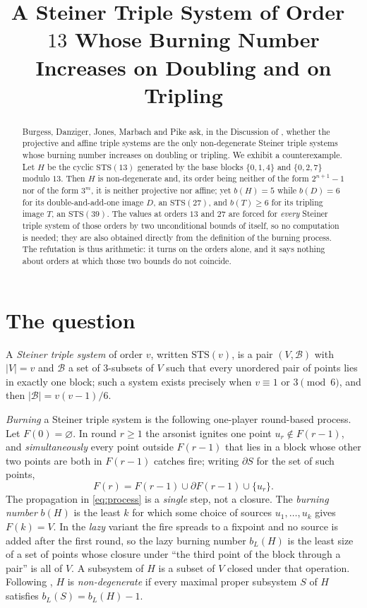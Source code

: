 \documentclass[11pt]{amsart}
\title[An $\STS(13)$ whose burning number increases]
{A Steiner Triple System of Order~$13$ Whose Burning Number
 Increases on Doubling and on Tripling}
\date{}
\newcommand{\STS}{\mathrm{STS}}
\newcommand{\bL}{b_{L}}
\begin{document}
\begin{abstract}
Burgess, Danziger, Jones, Marbach and Pike ask, in the Discussion of
\cite{BDJMP}, whether the projective and affine triple systems are the only
non-degenerate Steiner triple systems whose burning number increases on
doubling or tripling. We exhibit a counterexample. Let $H$ be the cyclic
$\STS(13)$ generated by the base blocks $\{0,1,4\}$ and $\{0,2,7\}$ modulo
$13$. Then $H$ is non-degenerate and, its order being neither of the form
$2^{n+1}-1$ nor of the form $3^{m}$, it is neither projective nor affine; yet
$b(H)=5$ while $b(D)=6$ for its double-and-add-one image $D$, an $\STS(27)$,
and $b(T)\ge6$ for its tripling image $T$, an $\STS(39)$. The values at orders
$13$ and $27$ are forced for \emph{every} Steiner triple system of those orders
by two unconditional bounds of \cite{BDJMP} itself, so no computation is
needed; they are also obtained directly from the definition of the burning
process. The refutation is thus arithmetic: it turns on the orders alone, and
it says nothing about orders at which those two bounds do not coincide.
\end{abstract}

\maketitle

\section{The question}

A \emph{Steiner triple system} of order $v$, written $\STS(v)$, is a pair
$(V,\mathcal B)$ with $|V|=v$ and $\mathcal B$ a set of $3$-subsets of $V$ such
that every unordered pair of points lies in exactly one block; such a system
exists precisely when $v\equiv1$ or $3\pmod 6$, and then
$|\mathcal B|=v(v-1)/6$.

\emph{Burning} a Steiner triple system \cite{BJP,BDJMP} is the following
one-player round-based process. Let $F(0)=\varnothing$. In round $r\ge1$ the
arsonist ignites one point $u_r\notin F(r-1)$, and \emph{simultaneously} every
point outside $F(r-1)$ that lies in a block whose other two points are both in
$F(r-1)$ catches fire; writing $\partial S$ for the set of such points,
\begin{equation}\label{eq:process}
  F(r)=F(r-1)\cup\partial F(r-1)\cup\{u_r\}.
\end{equation}
The propagation in \eqref{eq:process} is a \emph{single} step, not a closure.
The \emph{burning number} $b(H)$ is the least $k$ for which some choice of
sources $u_1,\dots,u_k$ gives $F(k)=V$. In the \emph{lazy} variant the fire
spreads to a fixpoint and no source is added after the first round, so the lazy
burning number $\bL(H)$ is the least size of a set of points whose closure
under ``the third point of the block through a pair'' is all of $V$. A
subsystem of $H$ is a subset of $V$ closed under that operation. Following
\cite{BDJMP}, $H$ is \emph{non-degenerate} if every maximal proper
subsystem $S$ of $H$ satisfies $\bL(S)=\bL(H)-1$.
\end{document}
